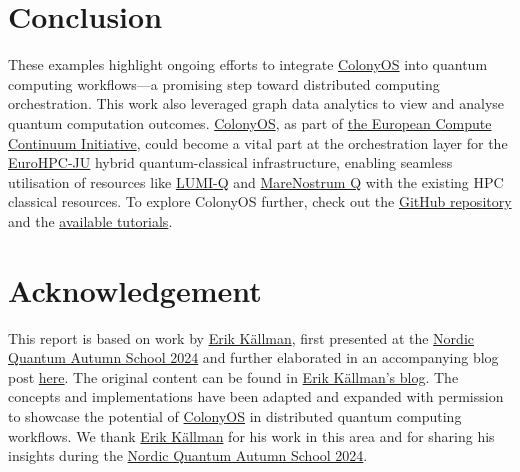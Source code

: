 \documentclass{article}
\begin{document}
\section{Conclusion}\label{sec:conclusion}
These examples highlight ongoing efforts to integrate \href{https://colonyos.io/}{ColonyOS} into quantum computing workflows---a promising step toward distributed computing orchestration. This work also leveraged graph data analytics to view and analyse
quantum computation outcomes. \href{https://colonyos.io/}{ColonyOS}, as part of \href{https://eucloudedgeiot.eu/decentralised-edge-to-cloud computing-with-colonyos-recording-now-available/}{the European Compute Continuum Initiative}, could become a vital part at the
orchestration layer for the \href{https://eurohpc-ju.europa.eu/index_en}{EuroHPC-JU} hybrid quantum-classical infrastructure, enabling seamless utilisation of resources like \href{https://eurohpc-ju.europa.eu/advancing-european-quantum-computing-signature-procurement contract-eurohpc-quantum-computer-located-2024-09-26_en}{LUMI-Q} and \href{https://eurohpc-ju.europa.eu/signature-procurement-contract eurohpc-quantum-computer-located-spain-2025-01-28_en}{MareNostrum Q} with the existing HPC classical resources. To explore ColonyOS further, check out the \href{https://github.com/colonyos}{GitHub repository} and the \href{https://github.com/colonyos/tutorials}{available tutorials}.

\section{Acknowledgement}\label{sec:acknowledgement}

This report is based on work by \href{https://www.ri.se/sv/person/erik-kallman}{Erik Källman}, first presented at the \href{https://enccs.github.io/qas2024/_downloads/e7a4c465a0e6318304e776636c9d317f/QAS-COS.pdf}{Nordic
Quantum Autumn School 2024} and further elaborated in an accompanying blog post \href{https://www.ekprojectjournal.com/doku.php id=projects:quantum:distributed}{here}. The original content can be found in \href{https://www.ekprojectjournal.com/doku.php?id=projects:quantum:distributed}{Erik Källman's blog}. The concepts and implementations have been adapted and expanded with permission to showcase the potential of \href{https://colonyos.io/}{ColonyOS} in distributed quantum computing workflows. We thank \href{https://www.ri.se/sv/person/erik-kallman}{Erik Källman} for his work in this area and for sharing his insights during the \href{https://enccs.github.io/qas2024/cos/}{Nordic Quantum Autumn School 2024}.
\end{document}
